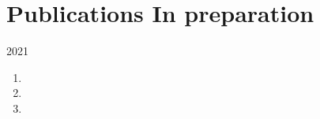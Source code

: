 \section*{Publications {\small In preparation}}

\begin{paracol}{2}
  2021
\switchcolumn
  \begin{enumerate}
    \setcounter{enumi}{\thepubcounter}
    \item {}
    \item {}
    \item {}
    \setcounter{pubcounter}{\theenumi}
  \end{enumerate}
\end{paracol}